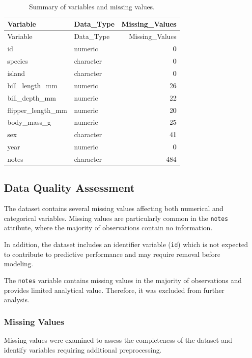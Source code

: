 \documentclass[
]{article}
\begin{document}
\begin{longtable}[]{@{}llr@{}}
\caption{Summary of variables and missing values.}\tabularnewline
\toprule\noalign{}
Variable & Data\_Type & Missing\_Values \\
\midrule\noalign{}
\endfirsthead
\toprule\noalign{}
Variable & Data\_Type & Missing\_Values \\
\midrule\noalign{}
\endhead
\bottomrule\noalign{}
\endlastfoot
id & numeric & 0 \\
species & character & 0 \\
island & character & 0 \\
bill\_length\_mm & numeric & 26 \\
bill\_depth\_mm & numeric & 22 \\
flipper\_length\_mm & numeric & 20 \\
body\_mass\_g & numeric & 25 \\
sex & character & 41 \\
year & numeric & 0 \\
notes & character & 484 \\
\end{longtable}

\subsection{Data Quality Assessment}\label{data-quality-assessment}

The dataset contains several missing values affecting both numerical and
categorical variables. Missing values are particularly common in the
\texttt{notes} attribute, where the majority of observations contain no
information.

In addition, the dataset includes an identifier variable (\texttt{id})
which is not expected to contribute to predictive performance and may
require removal before modeling.

The \texttt{notes} variable contains missing values in the majority of
observations and provides limited analytical value. Therefore, it was
excluded from further analysis.

\subsubsection{Missing Values}\label{missing-values}

Missing values were examined to assess the completeness of the dataset
and identify variables requiring additional preprocessing.
\end{document}
